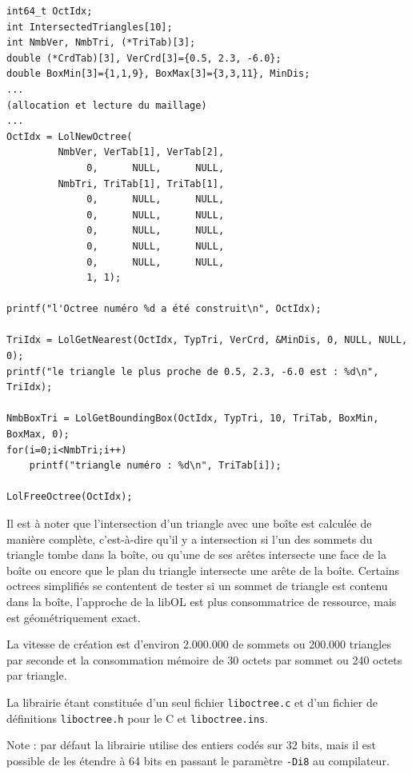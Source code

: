 \documentclass[a4paper,12pt]{article}
\begin{document}
\begin{tt}
\begin{verbatim}
int64_t OctIdx;
int IntersectedTriangles[10];
int NmbVer, NmbTri, (*TriTab)[3];
double (*CrdTab)[3], VerCrd[3]={0.5, 2.3, -6.0};
double BoxMin[3]={1,1,9}, BoxMax[3]={3,3,11}, MinDis;
...
(allocation et lecture du maillage)
...
OctIdx = LolNewOctree(
         NmbVer, VerTab[1], VerTab[2],
              0,      NULL,      NULL,
         NmbTri, TriTab[1], TriTab[1],
              0,      NULL,      NULL,
              0,      NULL,      NULL,
              0,      NULL,      NULL,
              0,      NULL,      NULL,
              0,      NULL,      NULL,
              1, 1);

printf("l'Octree numéro %d a été construit\n", OctIdx);

TriIdx = LolGetNearest(OctIdx, TypTri, VerCrd, &MinDis, 0, NULL, NULL, 0);
printf("le triangle le plus proche de 0.5, 2.3, -6.0 est : %d\n", TriIdx);

NmbBoxTri = LolGetBoundingBox(OctIdx, TypTri, 10, TriTab, BoxMin, BoxMax, 0);
for(i=0;i<NmbTri;i++)
    printf("triangle numéro : %d\n", TriTab[i]);

LolFreeOctree(OctIdx);
\end{verbatim}
\end{tt}
\normalfont

Il est à noter que l'intersection d'un triangle avec une boîte est calculée de manière complète, c'est-à-dire qu'il y a intersection si l'un des sommets du triangle tombe dans la boîte, ou qu’une de ses arêtes intersecte une face de la boîte ou encore que le plan du triangle intersecte une arête de la boîte. Certains octrees simplifiés se contentent de tester si un sommet de triangle est contenu dans la boîte, l'approche de la libOL est plus consommatrice de ressource, mais est géométriquement exact.

La vitesse de création est d'environ 2.000.000 de sommets ou 200.000 triangles par seconde et la consommation mémoire de 30 octets par sommet ou 240 octets par triangle.

La librairie étant constituée d'un seul fichier {\tt liboctree.c} et d'un fichier de définitions {\tt liboctree.h} pour le C et {\tt liboctree.ins}.

Note : par défaut la librairie utilise des entiers codés sur 32 bits, mais il est possible de les étendre à 64 bits en passant le paramètre {\tt -Di8} au compilateur.


%
%
\end{document}
